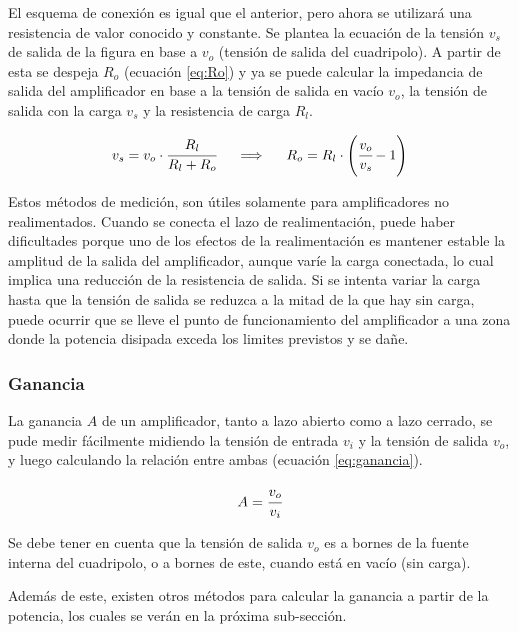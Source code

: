 El esquema de conexión es igual que el anterior, pero ahora se utilizará una resistencia de valor conocido y constante. Se plantea la ecuación de la tensión $v_s$ de salida de la figura en base a $v_o$ (tensión de salida del cuadripolo). A partir de esta se despeja $R_o$ (ecuación \ref{eq:Ro}) y ya se puede calcular la impedancia de salida del amplificador en base a la tensión de salida en vacío $v_o$, la tensión de salida con la carga $v_s$ y la resistencia de carga $R_l$.

\begin{equation}
    v_s = v_o \cdot \cfrac{R_l}{R_l + R_o}
    \hspace{5mm}\Longrightarrow\hspace{5mm}
    R_o = R_l \cdot \left( \cfrac{v_o}{v_s} - 1 \right)
    \label{eq:Ro}
\end{equation}

Estos métodos de medición, son útiles solamente para amplificadores no realimentados. Cuando se conecta el lazo de realimentación, puede haber dificultades porque uno de los efectos de la realimentación es mantener estable la amplitud de la salida del amplificador, aunque varíe la carga conectada, lo cual implica una reducción de la resistencia de salida.
Si se intenta variar la carga hasta que la tensión de salida se reduzca a la mitad de la que hay sin carga, puede ocurrir que se lleve el punto de funcionamiento del amplificador a una zona donde la potencia disipada exceda los limites previstos y se dañe.


\subsubsection{Ganancia}\label{sec:Gan}


La ganancia $A$ de un amplificador, tanto a lazo abierto como a lazo cerrado, se pude medir fácilmente midiendo la tensión de entrada $v_i$ y la tensión de salida $v_o$, y luego calculando la relación entre ambas (ecuación \ref{eq:ganancia}).

\begin{equation}
    A = \cfrac{v_o}{v_i}
    \label{eq:ganancia}
\end{equation}

Se debe tener en cuenta que la tensión de salida $v_o$ es a bornes de la fuente interna del cuadripolo, o a bornes de este, cuando está en vacío (sin carga).  

Además de este, existen otros métodos para calcular la ganancia a partir de la potencia, los cuales se verán en la próxima sub-sección.



